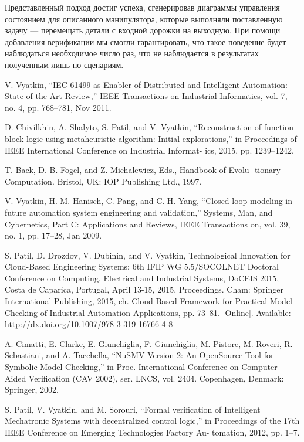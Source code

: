 \documentclass[14pt]{extarticle}
\theoremstyle{plain}
\theoremstyle{definition}
\begin{document}
Представленный подход достиг успеха, сгенерировав диаграммы управления состоянием для
описанного манипулятора, которые выполняли поставленную задачу --- перемещать детали
с входной дорожки на выходную. При помощи добавления верификации мы смогли гарантировать,
что такое поведение будет наблюдаться необходимое число раз, что не наблюдается в
результатах полученным лишь по сценариям. 

\pagebreak

\begin{thebibliography}{99}

V. Vyatkin, “IEC 61499 as Enabler of Distributed and Intelligent
Automation: State-of-the-Art Review,” IEEE Transactions on Industrial
Informatics, vol. 7, no. 4, pp. 768–781, Nov 2011.

D. Chivilkhin, A. Shalyto, S. Patil, and V. Vyatkin, “Reconstruction of
function block logic using metaheuristic algorithm: Initial explorations,”
in Proceedings of IEEE International Conference on Industrial Informat-
ics, 2015, pp. 1239–1242.

T. Back, D. B. Fogel, and Z. Michalewicz, Eds., Handbook of Evolu-
tionary Computation. Bristol, UK: IOP Publishing Ltd., 1997.

V. Vyatkin, H.-M. Hanisch, C. Pang, and C.-H. Yang, “Closed-loop
modeling in future automation system engineering and validation,”
Systems, Man, and Cybernetics, Part C: Applications and Reviews, IEEE
Transactions on, vol. 39, no. 1, pp. 17–28, Jan 2009.

S. Patil, D. Drozdov, V. Dubinin, and V. Vyatkin, Technological
Innovation for Cloud-Based Engineering Systems: 6th IFIP WG
5.5/SOCOLNET Doctoral Conference on Computing, Electrical and
Industrial Systems, DoCEIS 2015, Costa de Caparica, Portugal, April
13-15, 2015, Proceedings. Cham: Springer International Publishing,
2015, ch. Cloud-Based Framework for Practical Model-Checking of
Industrial Automation Applications, pp. 73–81. [Online]. Available:
http://dx.doi.org/10.1007/978-3-319-16766-4 8

A. Cimatti, E. Clarke, E. Giunchiglia, F. Giunchiglia, M. Pistore,
M. Roveri, R. Sebastiani, and A. Tacchella, “NuSMV Version 2: An
OpenSource Tool for Symbolic Model Checking,” in Proc. International
Conference on Computer-Aided Verification (CAV 2002), ser. LNCS, vol.
2404. Copenhagen, Denmark: Springer, 2002.

S. Patil, V. Vyatkin, and M. Sorouri, “Formal verification of Intelligent
Mechatronic Systems with decentralized control logic,” in Proceedings
of the 17th IEEE Conference on Emerging Technologies Factory Au-
tomation, 2012, pp. 1–7.


\end{thebibliography}
\end{document}
